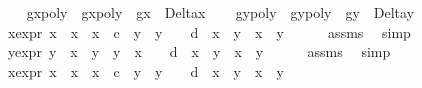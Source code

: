 \begin{isabellebody}
\ \ \isamarkupfalse%
\ gxpoly\ \ {\isachardoublequoteopen}gxpoly\ {\isacharequal}\ g\isactrlsub x\ {\isacharasterisk}\ Delta\isactrlsub x{\isachardoublequoteclose}\isanewline
\ \ \isamarkupfalse%
\ gypoly\ \ {\isachardoublequoteopen}gypoly\ {\isacharequal}\ g\isactrlsub y\ {\isacharasterisk}\ Delta\isactrlsub y{\isachardoublequoteclose}\isanewline
\isanewline
\ \ \isamarkupfalse%
\ x{}{\isacharprime}{\isacharunderscore}expr{\isacharcolon}\ {\isachardoublequoteopen}x{}{\isacharprime}\ {\isacharequal}\ {\isacharparenleft}x{}\ {\isacharasterisk}\ x{}\ {\isacharminus}\ c\ {\isacharasterisk}\ y{}\ {\isacharasterisk}\ y{}{\isacharparenright}\ {\isacharslash}\ {\isacharparenleft}{}\ {\isacharminus}\ d\ {\isacharasterisk}\ x{}\ {\isacharasterisk}\ y{}\ {\isacharasterisk}\ x{}\ {\isacharasterisk}\ y{}{\isacharparenright}{\isachardoublequoteclose}\isanewline
\ \ \ \ \isamarkupfalse%
\ assms{\isacharparenleft}{}{\isacharcomma}{}{\isacharparenright}\ \isamarkupfalse%
\ simp\isanewline
\ \ \isamarkupfalse%
\ y{}{\isacharprime}{\isacharunderscore}expr{\isacharcolon}\ {\isachardoublequoteopen}y{}{\isacharprime}\ {\isacharequal}\ {\isacharparenleft}x{}\ {\isacharasterisk}\ y{}\ {\isacharplus}\ y{}\ {\isacharasterisk}\ x{}{\isacharparenright}\ {\isacharslash}\ {\isacharparenleft}{}\ {\isacharplus}\ d\ {\isacharasterisk}\ x{}\ {\isacharasterisk}\ y{}\ {\isacharasterisk}\ x{}\ {\isacharasterisk}\ y{}{\isacharparenright}{\isachardoublequoteclose}\isanewline
\ \ \ \ \isamarkupfalse%
\ assms{\isacharparenleft}{}{\isacharcomma}{}{\isacharparenright}\ \isamarkupfalse%
\ simp\isanewline
\ \ \isamarkupfalse%
\ x{}{\isacharprime}{\isacharunderscore}expr{\isacharcolon}\ {\isachardoublequoteopen}x{}{\isacharprime}\ {\isacharequal}\ {\isacharparenleft}x{}\ {\isacharasterisk}\ x{}\ {\isacharminus}\ c\ {\isacharasterisk}\ y{}\ {\isacharasterisk}\ y{}{\isacharparenright}\ {\isacharslash}\ {\isacharparenleft}{}\ {\isacharminus}\ d\ {\isacharasterisk}\ x{}\ {\isacharasterisk}\ y{}\ {\isacharasterisk}\ x{}\ {\isacharasterisk}\ y{}{\isacharparenright}{\isachardoublequoteclose}\isanewline

\end{isabellebody}
